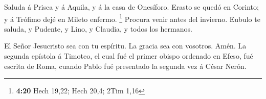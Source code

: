  Saluda á Prisca y á Aquila, y á la casa de Onesíforo.
 Erasto se quedó en Corinto; y á Trófimo dejé en Mileto
enfermo. \footnote{\textbf{4:20} Hech 19,22; Hech 20,4; 2Tim 1,16}
 Procura venir antes del invierno. Eubulo te saluda, y
Pudente, y Lino, y Claudia, y todos los hermanos.

 El Señor Jesucristo sea con tu espíritu. La gracia sea
con vosotros. Amén. La segunda epístola á Timoteo, el cual fué el primer
obispo ordenado en Efeso, fué escrita de Roma, cuando Pablo fué
presentado la segunda vez á César Nerón.

